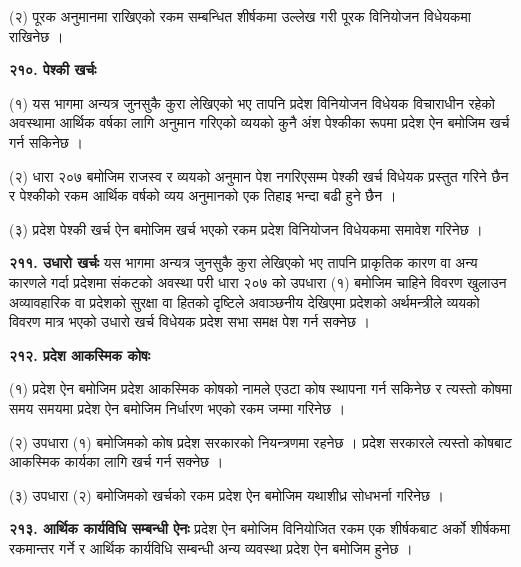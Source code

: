 (२) पूरक अनुमानमा राखिएको रकम सम्बन्धित शीर्षकमा उल्लेख गरी पूरक विनियोजन विधेयकमा राखिनेछ ।

\textbf{२१०. पेश्की खर्चः}

(१) यस भागमा अन्यत्र जुनसुकै कुरा लेखिएको भए तापनि प्रदेश विनियोजन विधेयक विचाराधीन रहेको अवस्थामा आर्थिक वर्षका लागि
अनुमान गरिएको व्ययको कुनै अंश पेश्कीका रूपमा प्रदेश ऐन बमोजिम खर्च गर्न सकिनेछ ।

(२) धारा २०७ बमोजिम राजस्व र व्ययको अनुमान पेश नगरिएसम्म पेश्की खर्च विधेयक प्रस्तुत गरिने छैन र पेश्कीको रकम आर्थिक वर्षको व्यय अनुमानको एक तिहाइ भन्दा बढी हुने छैन ।

(३) प्रदेश पेश्की खर्च ऐन बमोजिम खर्च भएको रकम प्रदेश विनियोजन विधेयकमा समावेश गरिनेछ ।

\textbf{२११. उधारो खर्चः} यस भागमा अन्यत्र जुनसुकै कुरा लेखिएको भए तापनि प्राकृतिक कारण वा अन्य कारणले गर्दा प्रदेशमा संकटको अवस्था परी धारा २०७ को उपधारा (१) बमोजिम चाहिने विवरण खुलाउन अव्यावहारिक वा प्रदेशको सुरक्षा वा हितको दृष्टिले अवाञ्छनीय देखिएमा प्रदेशको अर्थमन्त्रीले व्ययको विवरण मात्र भएको उधारो खर्च विधेयक प्रदेश सभा समक्ष पेश गर्न सक्नेछ ।

\textbf{२१२. प्रदेश आकस्मिक कोषः}

(१) प्रदेश ऐन बमोजिम प्रदेश आकस्मिक कोषको नामले एउटा कोष स्थापना गर्न सकिनेछ र त्यस्तो कोषमा समय समयमा प्रदेश ऐन बमोजिम निर्धारण भएको रकम जम्मा गरिनेछ ।

(२) उपधारा (१) बमोजिमको कोष प्रदेश सरकारको नियन्त्रणमा रहनेछ । प्रदेश सरकारले त्यस्तो कोषबाट आकस्मिक कार्यका लागि खर्च गर्न सक्नेछ ।

(३) उपधारा (२) बमोजिमको खर्चको रकम प्रदेश ऐन बमोजिम यथाशीध्र सोधभर्ना गरिनेछ ।

\textbf{२१३. आर्थिक कार्यविधि सम्बन्धी ऐनः} प्रदेश ऐन बमोजिम विनियोजित रकम एक शीर्षकबाट अर्को शीर्षकमा रकमान्तर गर्ने र आर्थिक कार्यविधि सम्बन्धी अन्य व्यवस्था प्रदेश ऐन बमोजिम हुनेछ ।